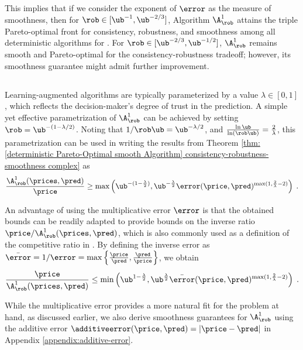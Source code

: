 This implies that if we consider the exponent of $\error$ as the measure of smoothness, then for $\rob \in [\ub^{-1}, \ub^{-2/3}]$, Algorithm $\A^1_\rob$ attains the triple Pareto-optimal front for consistency, robustness, and smoothness among all deterministic algorithms for \OMS{}. For $\rob \in [\ub^{-2/3}, \ub^{-1/2}]$, $\A^1_\rob$ remains smooth and Pareto-optimal for the consistency-robustness tradeoff; however, its smoothness guarantee might admit further improvement.





\subsection{}
Learning-augmented algorithms are typically parameterized by a value $\lambda \in [0,1]$, which reflects the decision-maker's degree of trust in the prediction. A simple yet effective parametrization of $\A^1_\rob$ can be achieved by setting $\rob = \ub^{-(1-\lambda/2)}$. Noting that $1/\rob \ub = \ub^{-\lambda/2}$, and $\frac{\ln \ub}{\ln (\rob \ub)} = \frac{2}{\lambda}$, this parametrization can be used in writing the results from Theorem \ref{thm: [deterministic Pareto-Optimal smooth Algorithm] consistency-robustness-smoothness complex} as
\[
\frac{\A^1_\rob(\prices, \pred)}{\price} \geq 
\max\left(
\ub^{-(1-\frac{\lambda}{2})}, \ub^{-\frac{\lambda}{2}} \error(\price,\pred)^{\max(1,\frac{2}{\lambda} - 2)}
\right)\;.
\]

An advantage of using the multiplicative error $\error$ is that the obtained bounds can be readily adapted to provide bounds on the inverse ratio $\price/\A^1_\rob(\prices,\pred)$, which is also commonly used as a definition of the competitive ratio in \OMS{} \cite{}. By defining the inverse error as $\Bar{\error} = 1/\error = \max\left\{\frac{\price}{\pred}, \frac{\pred}{\price}\right\}$, we obtain
\[
\frac{\price}{\A^1_\rob(\prices, \pred)} \leq 
\min\left(
\ub^{1-\frac{\lambda}{2}}, \ub^{\frac{\lambda}{2}} \Bar{\error}(\price,\pred)^{\max(1,\frac{2}{\lambda} - 2)}
\right)\;.
\]

While the multiplicative error provides a more natural fit for the problem at hand, as discussed earlier, we also derive smoothness guarantees for $\A^1_\rob$ using the additive error $\additiveerror(\price,\pred) = |\price - \pred|$ in Appendix \ref{appendix:additive-error}.

